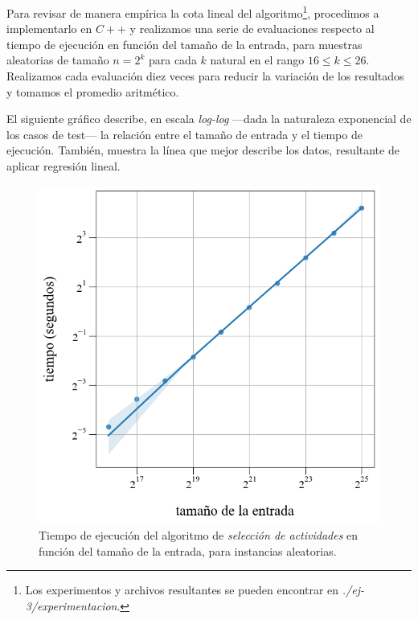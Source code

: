 \vspace{1em}
Para revisar de manera empírica la cota lineal del algoritmo\footnote{Los experimentos y archivos resultantes se pueden encontrar en \textit{./ej-3/experimentacion}.}, procedimos a implementarlo en $C++$ y realizamos una serie de evaluaciones respecto al tiempo de ejecución en función del tamaño de la entrada, para muestras aleatorias de tamaño $n = 2^k$ para cada $k$ natural en el rango $16 \leq k \leq 26$. Realizamos cada evaluación diez veces para reducir la variación de los resultados y tomamos el promedio aritmético. 

El siguiente gráfico describe, en escala \textit{log-log} ---dada la naturaleza exponencial de los casos de test--- la relación entre el tamaño de entrada y el tiempo de ejecución. También, muestra la línea que mejor describe los datos, resultante de aplicar regresión lineal.  
\begin{figure}[!htbp]
    \includegraphics[scale=0.5, clip]{./files/src/.media/aleatorio.png}
    \caption{Tiempo de ejecución del algoritmo de \textit{selección de actividades} en función del tamaño de la entrada, para instancias aleatorias.} \label{aleatorio}
\end{figure}

